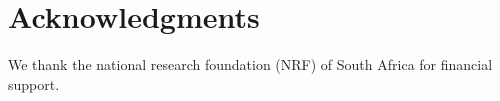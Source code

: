 \section{Acknowledgments}
We thank the national research foundation (NRF) of South Africa for financial support.
